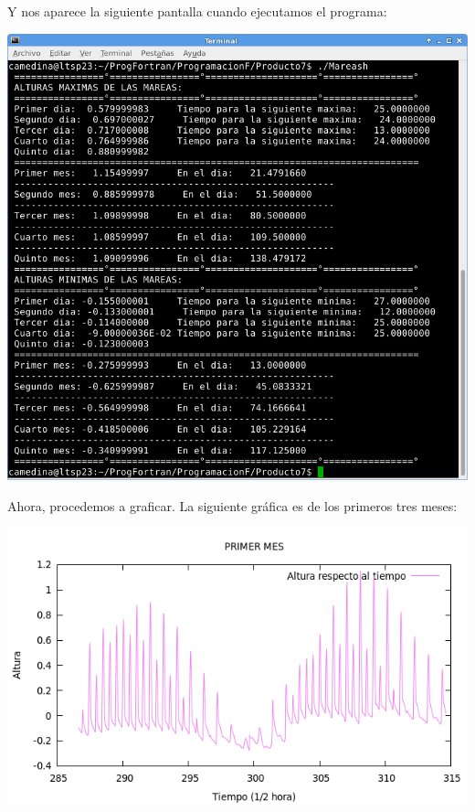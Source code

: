 \documentclass[12pt]{article}
\begin{document}
Y nos aparece la siguiente pantalla cuando ejecutamos el programa:


\begin{center}
	\includegraphics[width=15cm]{prog.png}\\
\end{center}	 

Ahora, procedemos a graficar. La siguiente gráfica es de los primeros tres meses:

\begin{center}
	\includegraphics[width=15cm]{graf1m.png}\\
\end{center}	
\end{document}
